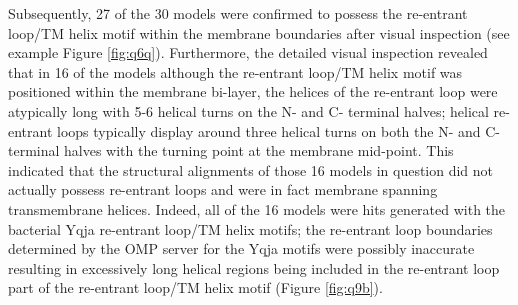 Subsequently, 27 of the 30 models were confirmed to possess the re-entrant loop/TM helix motif within the membrane boundaries after visual inspection (see example Figure \ref{fig:q6q}).  Furthermore, the detailed visual inspection revealed that in 16 of the models although the re-entrant loop/TM helix motif was positioned within the membrane bi-layer, the helices of the re-entrant loop were atypically long with 5-6 helical turns on the N- and C- terminal halves; helical re-entrant loops typically display around three helical turns on both the N- and C- terminal halves with the turning point at the membrane mid-point.  This indicated that the structural alignments of those 16 models in question did not actually possess re-entrant loops and were in fact membrane spanning transmembrane helices.  Indeed, all of the 16 models were hits generated with the bacterial Yqja re-entrant loop/TM helix motifs; the re-entrant loop boundaries determined by the OMP server for the Yqja motifs were possibly inaccurate resulting in excessively long helical regions being included in the re-entrant loop part of the re-entrant loop/TM helix motif (Figure \ref{fig:q9b}).  
